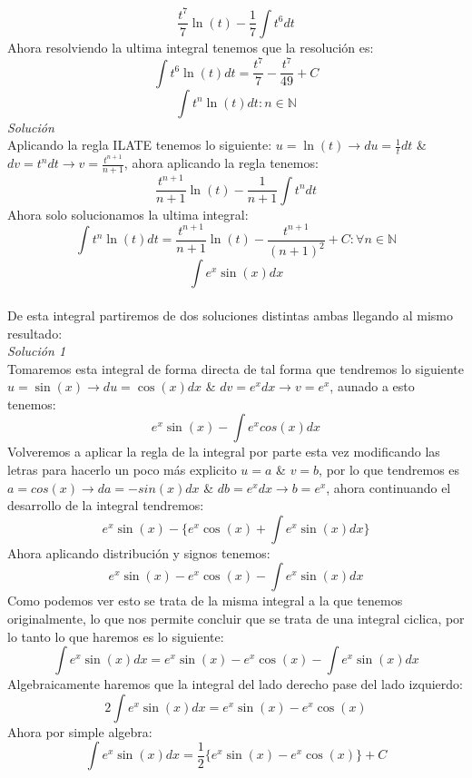 \documentclass[10pt]{article}
\begin{document}
\[\frac{t^7}{7}\ln(t)-\frac{1}{7}\int t^{6}dt\]
Ahora resolviendo la ultima integral tenemos que la resolución es:\\
\[\int t^{6}\ln(t)dt = \frac{t^{7}}{7}-\frac{t^{7}}{49} + C\]
\vspace{1cm}
\[\int t^{n}\ln(t)dt \colon n \in \mathbb{N}\]
\textit{Solución}\\
Aplicando la regla ILATE tenemos lo siguiente: $u=\ln(t)\rightarrow du=\frac{1}{t}dt$ \& $dv=t^{n}dt \rightarrow v=\frac{t^{n+1}}{n+1}$, ahora aplicando la regla tenemos:\\
\[\frac{t^{n+1}}{n+1}\ln(t)-\frac{1}{n+1}\int t^{n}dt\]
Ahora solo solucionamos la ultima integral:
\[\int t^{n}\ln(t)dt = \frac{t^{n+1}}{n+1}\ln(t)-\frac{t^{n+1}}{(n+1)^{2}} + C \colon \forall n \in \mathbb{N}\]
\vspace{1cm}
\[\int e^{x}\sin(x)dx\]\\
De esta integral partiremos de dos soluciones distintas ambas llegando al mismo resultado:\\
\textit{Solución 1}\\
Tomaremos esta integral de forma directa de tal forma que tendremos lo siguiente $u=\sin(x)\rightarrow du= \cos(x)dx$ \& $dv=e^{x}dx \rightarrow v=e^{x}$, aunado a esto tenemos:
\[e^{x}\sin(x) - \int e^{x}cos(x)dx \]
Volveremos a aplicar la regla de la integral por parte esta vez modificando las letras para hacerlo un poco más explicito $u=a$ \& $v=b$, por lo que tendremos es $a=cos(x) \rightarrow da=-sin(x)dx$ \& $db=e^{x}dx \rightarrow b=e^{x}$, ahora continuando el desarrollo de la integral tendremos:
\[e^{x}\sin(x)-\{e^{x}\cos(x)+\int e^{x}\sin(x)dx\}\]
Ahora aplicando distribución y signos tenemos:
\[e^{x}\sin(x)-e^{x}\cos(x)-\int e^{x}\sin(x)dx\]
Como podemos ver esto se trata de la misma integral a la que tenemos originalmente, lo que nos permite concluir que se trata de una integral ciclica, por lo tanto lo que haremos es lo siguiente:
\[\int e^{x}\sin(x)dx = e^{x}\sin(x)-e^{x}\cos(x)-\int e^{x}\sin(x)dx\]
Algebraicamente haremos que la integral del lado derecho pase del lado izquierdo:
\[2\int e^{x}\sin(x)dx = e^{x}\sin(x)-e^{x}\cos(x)\]
Ahora por simple algebra:
\[\int e^{x}\sin(x)dx = \frac{1}{2}\{e^{x}\sin(x)-e^{x}\cos(x)\}+C\]
\end{document}
